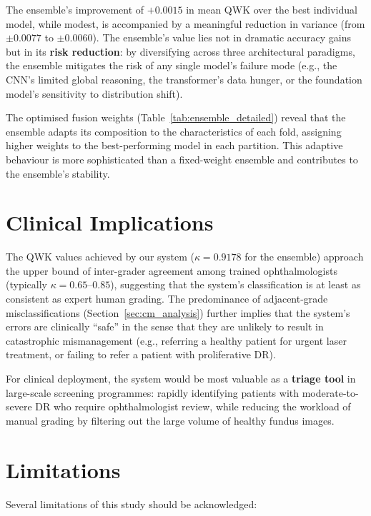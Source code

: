 The ensemble's improvement of $+0.0015$ in mean QWK over the best individual model, while modest, is accompanied by a meaningful reduction in variance (from $\pm 0.0077$ to $\pm 0.0060$). The ensemble's value lies not in dramatic accuracy gains but in its \textbf{risk reduction}: by diversifying across three architectural paradigms, the ensemble mitigates the risk of any single model's failure mode (e.g., the CNN's limited global reasoning, the transformer's data hunger, or the foundation model's sensitivity to distribution shift).

The optimised fusion weights (Table~\ref{tab:ensemble_detailed}) reveal that the ensemble adapts its composition to the characteristics of each fold, assigning higher weights to the best-performing model in each partition. This adaptive behaviour is more sophisticated than a fixed-weight ensemble and contributes to the ensemble's stability.

\section{Clinical Implications}
\label{sec:clinical}

The QWK values achieved by our system ($\kappa = 0.9178$ for the ensemble) approach the upper bound of inter-grader agreement among trained ophthalmologists (typically $\kappa = 0.65$--$0.85$), suggesting that the system's classification is at least as consistent as expert human grading. The predominance of adjacent-grade misclassifications (Section~\ref{sec:cm_analysis}) further implies that the system's errors are clinically ``safe'' in the sense that they are unlikely to result in catastrophic mismanagement (e.g., referring a healthy patient for urgent laser treatment, or failing to refer a patient with proliferative DR).

For clinical deployment, the system would be most valuable as a \textbf{triage tool} in large-scale screening programmes: rapidly identifying patients with moderate-to-severe DR who require ophthalmologist review, while reducing the workload of manual grading by filtering out the large volume of healthy fundus images.

\section{Limitations}
\label{sec:limitations}

Several limitations of this study should be acknowledged:

